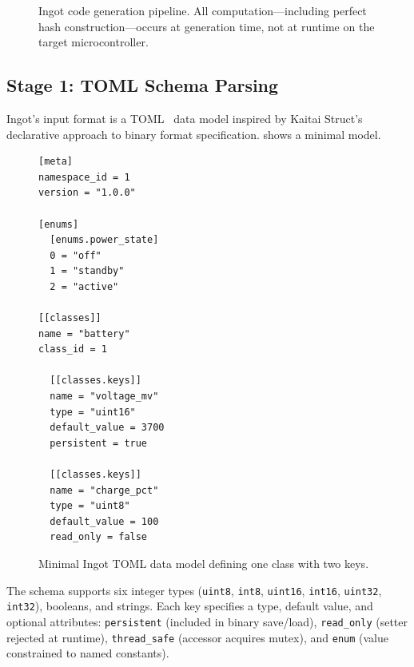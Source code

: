 \documentclass[10pt,twocolumn,letterpaper]{article}
\begin{document}
\begin{figure}[t]
\centering
{}
\caption{Ingot code generation pipeline.  All computation---including
perfect hash construction---occurs at generation time, not at runtime
on the target microcontroller.}
\label{fig:pipeline}
\end{figure}

\subsection{Stage 1: TOML Schema Parsing}

Ingot's input format is a TOML~\cite{toml} data model inspired by
Kaitai Struct's~\cite{kaitai} declarative approach to binary format
specification.   shows a minimal model.

\begin{figure}[t]
\begin{lstlisting}[language={},keywordstyle={}]
[meta]
namespace_id = 1
version = "1.0.0"

[enums]
  [enums.power_state]
  0 = "off"
  1 = "standby"
  2 = "active"

[[classes]]
name = "battery"
class_id = 1

  [[classes.keys]]
  name = "voltage_mv"
  type = "uint16"
  default_value = 3700
  persistent = true

  [[classes.keys]]
  name = "charge_pct"
  type = "uint8"
  default_value = 100
  read_only = false
\end{lstlisting}
\caption{Minimal Ingot TOML data model defining one class with two
keys.}
\label{fig:toml-example}
\end{figure}

The schema supports six integer types (\texttt{uint8}, \texttt{int8},
\texttt{uint16}, \texttt{int16}, \texttt{uint32}, \texttt{int32}),
booleans, and strings.  Each key specifies a type, default value, and
optional attributes: \texttt{persistent} (included in binary
save/load), \texttt{read\_only} (setter rejected at runtime),
\texttt{thread\_safe} (accessor acquires mutex), and \texttt{enum}
(value constrained to named constants).
\end{document}
